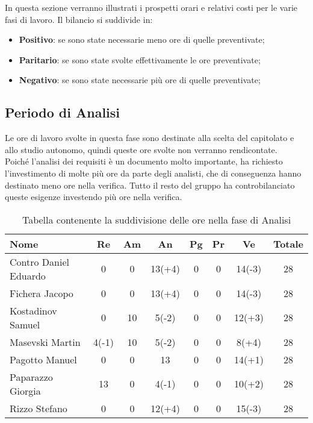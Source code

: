 \documentclass[../piano_di_progetto.tex]{subfiles}
\begin{document}
In questa sezione verranno illustrati i prospetti orari e relativi costi per le varie fasi di lavoro. Il bilancio si suddivide in:
\begin{itemize}
\item \textbf{Positivo}: se sono state necessarie meno ore di quelle preventivate;
\item \textbf{Paritario}: se sono state svolte effettivamente le ore preventivate;
\item \textbf{Negativo}: se sono state necessarie più ore di quelle preventivate;
\end{itemize}

\subsection{ Periodo di Analisi}%
\label{sub:cons_analisi}
Le ore di lavoro svolte in questa fase sono destinate alla scelta del capitolato e allo studio autonomo, quindi queste ore svolte non verranno rendicontate.\\
Poiché l'analisi dei requisiti è un documento molto importante, ha richiesto l'investimento di molte più ore da parte degli analisti, che di conseguenza hanno destinato meno ore nella verifica. 
Tutto il resto del gruppo ha controbilanciato queste esigenze investendo più ore nella verifica.

\begin{table}[!ht]
	\centering
	\begin{tabular}{|l|c|c|c|c|c|c|c|}
	\hline
	\rowcolor{lightgray}
	\textbf{Nome} & \textbf{Re} & \textbf{Am} & \textbf{An} & \textbf{Pg}  & \textbf{Pr}   & \textbf{Ve} & \textbf{Totale}\\
	\hline
		Contro Daniel Eduardo & 0 & 0 & 13(+4) & 0 & 0 & 14(-3) & 28 \\
	\hline
		Fichera Jacopo & 0 & 0 & 13(+4) & 0 & 0 & 14(-3) & 28 \\
	\hline
		Kostadinov Samuel & 0 & 10 & 5(-2) & 0 & 0 & 12(+3) & 28 \\			
	\hline
		Masevski Martin & 4(-1) & 10 & 5(-2) & 0 & 0 & 8(+4) & 28 \\
	\hline
		Pagotto Manuel & 0 & 0 & 13 & 0 & 0 & 14(+1) & 28 \\			
	\hline
		Paparazzo Giorgia & 13 & 0 & 4(-1) & 0 & 0 & 10(+2) & 28 \\
	\hline
		Rizzo Stefano & 0 & 0 & 12(+4) & 0 & 0 & 15(-3) & 28 \\
	\hline	
	\end{tabular}
	\caption{Tabella contenente la suddivisione delle ore nella fase di Analisi}
\end{table}
\end{document}
